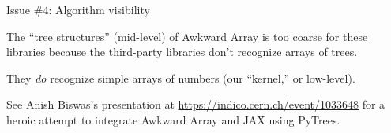 \documentclass[aspectratio=169]{beamer}
\begin{document}
\begin{frame}{Issue \#4: Algorithm visibility}
\large
\vspace{0.5 cm}

The ``tree structures'' (mid-level) of Awkward Array is too coarse for these libraries because the third-party libraries don't recognize arrays of trees.

\vspace{0.5 cm}
They {\it do} recognize simple arrays of numbers (our ``kernel,'' or low-level).

\vspace{0.5 cm}
See Anish Biswas's presentation at \textcolor{blue}{\href{https://indico.cern.ch/event/1033648}{https://indico.cern.ch/event/1033648}} for a heroic attempt to integrate Awkward Array and JAX using PyTrees.

\vspace{0.5 cm}
\end{frame}
\end{document}

